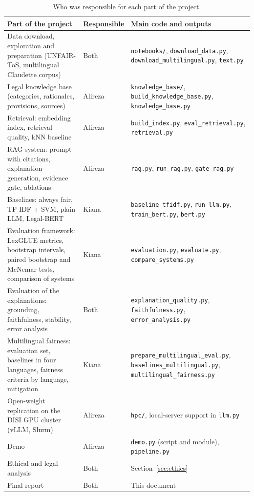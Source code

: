 \begin{table}[ht]
\centering\small
\caption{Who was responsible for each part of the project.}
\label{tab:work}
\begin{tabularx}{\textwidth}{@{}>{\raggedright\arraybackslash}p{5.6cm}p{2.2cm}>{\raggedright\arraybackslash}X@{}}
\toprule
Part of the project & Responsible & Main code and outputs \\
\midrule
Data download, exploration and preparation (UNFAIR-ToS, multilingual Claudette corpus) & Both & \texttt{notebooks/}, \texttt{download\_data.py}, \texttt{download\_multilingual.py}, \texttt{text.py} \\
Legal knowledge base (categories, rationales, provisions, sources) & Alireza & \texttt{knowledge\_base/}, \texttt{build\_knowledge\_base.py}, \texttt{knowledge\_base.py} \\
Retrieval: embedding index, retrieval quality, kNN baseline & Alireza & \texttt{build\_index.py}, \texttt{eval\_retrieval.py}, \texttt{retrieval.py} \\
RAG system: prompt with citations, explanation generation, evidence gate, ablations & Alireza & \texttt{rag.py}, \texttt{run\_rag.py}, \texttt{gate\_rag.py} \\
Baselines: always fair, TF-IDF + SVM, plain LLM, Legal-BERT & Kiana & \texttt{baseline\_tfidf.py}, \texttt{run\_llm.py}, \texttt{train\_bert.py}, \texttt{bert.py} \\
Evaluation framework: LexGLUE metrics, bootstrap intervals, paired bootstrap and McNemar tests, comparison of systems & Kiana & \texttt{evaluation.py}, \texttt{evaluate.py}, \texttt{compare\_systems.py} \\
Evaluation of the explanations: grounding, faithfulness, stability, error analysis & Both & \texttt{explanation\_quality.py}, \texttt{faithfulness.py}, \texttt{error\_analysis.py} \\
Multilingual fairness: evaluation set, baselines in four languages, fairness criteria by language, mitigation & Kiana & \texttt{prepare\_multilingual\_eval.py}, \texttt{baselines\_multilingual.py}, \texttt{multilingual\_fairness.py} \\
Open-weight replication on the DISI GPU cluster (vLLM, Slurm) & Alireza & \texttt{hpc/}, local-server support in \texttt{llm.py} \\
Demo & Alireza & \texttt{demo.py} (script and module), \texttt{pipeline.py} \\
Ethical and legal analysis & Both & Section~\ref{sec:ethics} \\
Final report & Both & This document \\
\bottomrule
\end{tabularx}
\end{table}
